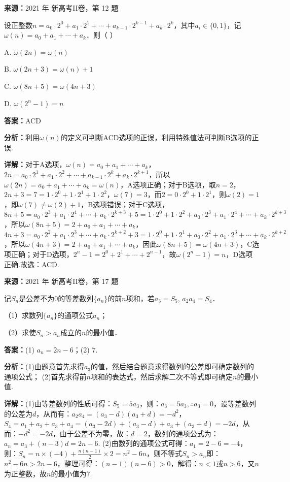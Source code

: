 \begin{question}[points=5]
\textbf{来源：}2021 年 新高考II卷，第 12 题\par
设正整数$n=a_0\cdot2^0+a_1\cdot2^1+\cdots+a_{k-1}\cdot2^{k-1}+a_k\cdot2^k$，其中$a_i\in\{0,1\}$，记$\omega(n)=a_0+a_1+\cdots+a_k$．则（ ）
\begin{choices}
  \item A. $\omega(2n)=\omega(n)$
  \item B. $\omega(2n+3)=\omega(n)+1$
  \item C. $\omega(8n+5)=\omega(4n+3)$
  \item D. $\omega(2^n-1)=n$
\end{choices}
\begin{solution}
\textbf{答案：}ACD

\textbf{分析：}利用$\omega(n)$的定义可判断ACD选项的正误，利用特殊值法可判断B选项的正误.

\textbf{详解：}对于A选项，$\omega(n)=a_0+a_1+\cdots+a_k$，$2n=a_0\cdot2^1+a_1\cdot2^2+\cdots+a_{k-1}\cdot2^k+a_k\cdot2^{k+1}$，所以$\omega(2n)=a_0+a_1+\cdots+a_k=\omega(n)$，A选项正确；对于B选项，取$n=2$，$2n+3=7=1\cdot2^0+1\cdot2^1+1\cdot2^2$，$\omega(7)=3$，而$2=0\cdot2^0+1\cdot2^1$，则$\omega(2)=1$，即$\omega(7)\neq\omega(2)+1$，B选项错误；对于C选项，$8n+5=a_0\cdot2^3+a_1\cdot2^4+\cdots+a_k\cdot2^{k+3}+5=1\cdot2^0+1\cdot2^2+a_0\cdot2^3+a_1\cdot2^4+\cdots+a_k\cdot2^{k+3}$，所以$\omega(8n+5)=2+a_0+a_1+\cdots+a_k$，$4n+3=a_0\cdot2^2+a_1\cdot2^3+\cdots+a_k\cdot2^{k+2}+3=1\cdot2^0+1\cdot2^1+a_0\cdot2^2+a_1\cdot2^3+\cdots+a_k\cdot2^{k+2}$，所以$\omega(4n+3)=2+a_0+a_1+\cdots+a_k$，因此$\omega(8n+5)=\omega(4n+3)$，C选项正确；对于D选项，$2^n-1=2^0+2^1+\cdots+2^{n-1}$，故$\omega(2^n-1)=n$，D选项正确.故选：ACD.
\end{solution}
\end{question}

\begin{question}[points=10]
\textbf{来源：}2021 年 新高考II卷，第 17 题\par
记$S_n$是公差不为$0$的等差数列$\{a_n\}$的前$n$项和，若$a_3=S_5$, $a_2a_4=S_4$．

（1）求数列$\{a_n\}$的通项公式$a_n$；

（2）求使$S_n>a_n$成立的$n$的最小值．
\begin{solution}
\textbf{答案：}(1) $a_n=2n-6$；(2) $7$.

\textbf{分析：}(1)由题意首先求得$a_3$的值，然后结合题意求得数列的公差即可确定数列的通项公式； (2)首先求得前$n$项和的表达式，然后求解二次不等式即可确定$n$的最小值.

\textbf{详解：}(1)由等差数列的性质可得：$S_5=5a_3$，则：$a_3=5a_3,\therefore a_3=0$，设等差数列的公差为$d$，从而有：$a_2a_4=(a_3-d)(a_3+d)=-d^2$，$S_4=a_1+a_2+a_3+a_4=(a_3-2d)+(a_3-d)+a_3+(a_3+d)=-2d$，从而：$-d^2=-2d$，由于公差不为零，故：$d=2$，数列的通项公式为：$a_n=a_3+(n-3)d=2n-6$. (2)由数列的通项公式可得：$a_1=2-6=-4$，则：$S_n=n\times(-4)+\frac{n(n-1)}{2}\times2=n^2-6n$，则不等式$S_n>a_n$即：$n^2-6n>2n-6$，整理可得：$(n-1)(n-6)>0$，解得：$n<1$或$n>6$，又$n$为正整数，故$n$的最小值为$7$.
\end{solution}
\end{question}

